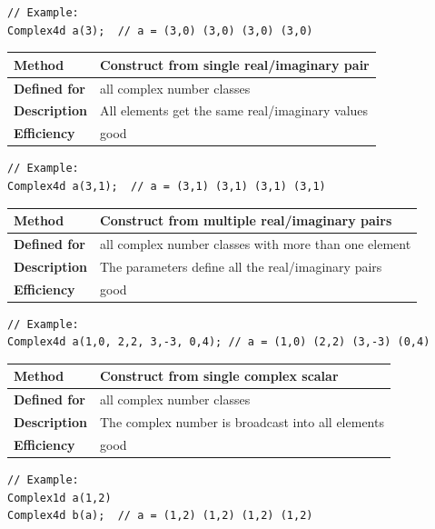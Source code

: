 \documentclass[11pt,a4paper,oneside,openright]{report}
\newcommand{\vspacesmall}{\vspace{3mm}}
\newcommand{\vspacebig}{\vspace{6mm}}
\begin{document}
\begin{lstlisting}[frame=none]
// Example:
Complex4d a(3);  // a = (3,0) (3,0) (3,0) (3,0)
\end{lstlisting}
\vspacebig


\begin{tabular}{|p{25mm}|p{100mm}|}
\hline
\bfseries Method & Construct from single real/imaginary pair \\ \hline
\bfseries Defined for & all complex number classes \\ \hline
\bfseries Description & All elements get the same real/imaginary values \\ \hline
\bfseries Efficiency & good \\ \hline
\end{tabular}
\vspacesmall

\begin{lstlisting}[frame=none]
// Example:
Complex4d a(3,1);  // a = (3,1) (3,1) (3,1) (3,1)
\end{lstlisting}
\vspacebig


\begin{tabular}{|p{25mm}|p{100mm}|}
\hline
\bfseries Method & Construct from multiple real/imaginary pairs \\ \hline
\bfseries Defined for & all complex number classes with more than one element \\ \hline
\bfseries Description & The parameters define all the real/imaginary pairs \\ \hline
\bfseries Efficiency & good \\ \hline
\end{tabular}
\vspacesmall

\begin{lstlisting}[frame=none]
// Example:
Complex4d a(1,0, 2,2, 3,-3, 0,4); // a = (1,0) (2,2) (3,-3) (0,4)
\end{lstlisting}
\vspacebig


\begin{tabular}{|p{25mm}|p{100mm}|}
\hline
\bfseries Method & Construct from single complex scalar \\ \hline
\bfseries Defined for & all complex number classes \\ \hline
\bfseries Description & The complex number is broadcast into all elements \\ \hline
\bfseries Efficiency & good \\ \hline
\end{tabular}
\vspacesmall

\begin{lstlisting}[frame=none]
// Example:
Complex1d a(1,2)
Complex4d b(a);  // a = (1,2) (1,2) (1,2) (1,2)
\end{lstlisting}
\vspacebig
\end{document}
